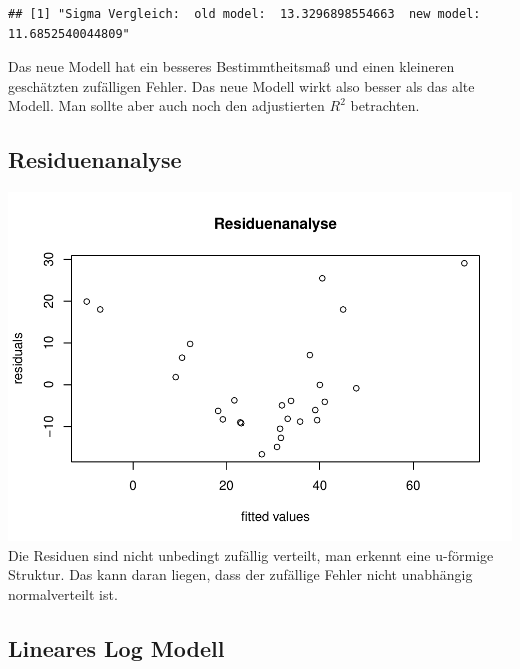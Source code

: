 \documentclass[]{article}
\newenvironment{Shaded}{\begin{snugshade}}{\end{snugshade}}
\newcommand{\DataTypeTok}[1]{\textcolor[rgb]{0.13,0.29,0.53}{#1}}
\newcommand{\KeywordTok}[1]{\textcolor[rgb]{0.13,0.29,0.53}{\textbf{#1}}}
\newcommand{\NormalTok}[1]{#1}
\newcommand{\OperatorTok}[1]{\textcolor[rgb]{0.81,0.36,0.00}{\textbf{#1}}}
\newcommand{\StringTok}[1]{\textcolor[rgb]{0.31,0.60,0.02}{#1}}
\begin{document}
\begin{verbatim}
## [1] "Sigma Vergleich:  old model:  13.3296898554663  new model:  11.6852540044809"
\end{verbatim}

Das neue Modell hat ein besseres Bestimmtheitsmaß und einen kleineren geschätzten zufälligen Fehler.
Das neue Modell wirkt also besser als das alte Modell. Man sollte aber auch noch den adjustierten \(R^2\) betrachten.

\hypertarget{residuenanalyse}{%
\subsection{Residuenanalyse}\label{residuenanalyse}}

\begin{Shaded}
\end{Shaded}

\includegraphics{BelaSchinkeAusarbeitung_files/figure-latex/unnamed-chunk-20-1.pdf}
Die Residuen sind nicht unbedingt zufällig verteilt, man erkennt eine u-förmige Struktur. Das kann daran liegen, dass der
zufällige Fehler nicht unabhängig normalverteilt ist.

\hypertarget{lineares-log-modell}{%
\subsection{Lineares Log Modell}\label{lineares-log-modell}}
\end{document}
